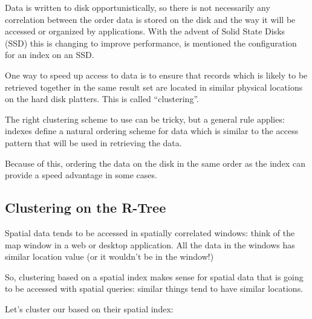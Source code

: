 \documentclass[a4paper,11pt,english]{sphinxmanual}
\begin{document}
Data is written to disk opportunistically, so there is not necessarily any correlation between the order data is stored on the disk and the way it will be accessed or organized by applications. With the advent of Solid State Disks (SSD) this is changing to improve performance,  is mentioned the configuration for an index on an SSD.

\noindent{}

One way to speed up access to data is to ensure that records which is likely to be retrieved together in the same result set are located in similar physical locations on the hard disk platters. This is called “clustering”.

The right clustering scheme to use can be tricky, but a general rule applies: indexes define a natural ordering scheme for data which is similar to the access pattern that will be used in retrieving the data.

\noindent{}

Because of this, ordering the data on the disk in the same order as the index can provide a speed advantage in some cases.


\subsection{Clustering on the R-Tree}
\label{\detokenize{advanced:clustering-on-the-r-tree}}
Spatial data tends to be accessed in spatially correlated windows: think of the map window in a web or desktop application. All the data in the windows has similar location value (or it wouldn’t be in the window!)

So, clustering based on a spatial index makes sense for spatial data that is going to be accessed with spatial queries: similar things tend to have similar locations.

Let’s cluster our  based on their spatial index:

\begin{sphinxVerbatim}[commandchars=\\\{\}]
   
\end{sphinxVerbatim}
\end{document}

